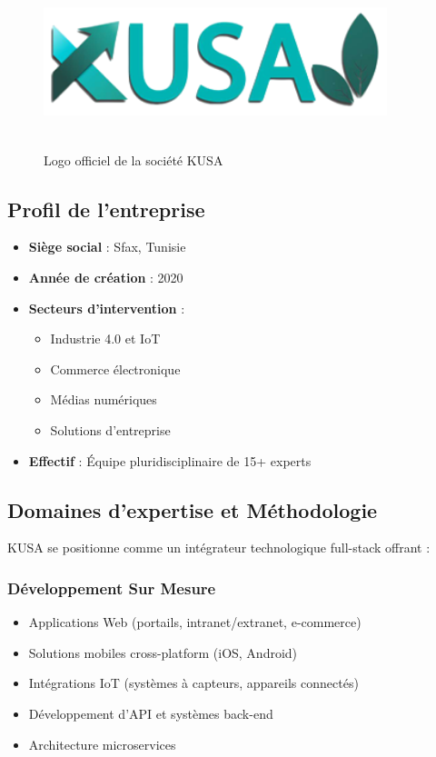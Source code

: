 \begin{figure}[hbt!]
  \centering
  \includegraphics[width=10cm,height=5cm]{images_pfe/kusa.png}
  \caption{Logo officiel de la société KUSA}
  \label{fig:kusa_logo}
\end{figure}
\FloatBarrier
\clearpage
\subsection{Profil de l'entreprise}
\begin{itemize}
    \item \textbf{Siège social} : Sfax, Tunisie
    \item \textbf{Année de création} : 2020
    \item \textbf{Secteurs d'intervention} : 
    \begin{itemize}
        \item Industrie 4.0 et IoT
        \item Commerce électronique
        \item Médias numériques
        \item Solutions d'entreprise
    \end{itemize}
    \item \textbf{Effectif} : Équipe pluridisciplinaire de 15+ experts
\end{itemize}

\subsection{Domaines d'expertise et Méthodologie }
KUSA se positionne comme un intégrateur technologique full-stack offrant :

\subsubsection*{ Développement Sur Mesure}
\begin{itemize}
    \item Applications Web (portails, intranet/extranet, e-commerce)
    \item Solutions mobiles cross-platform (iOS, Android)
    \item Intégrations IoT (systèmes à capteurs, appareils connectés)
    \item Développement d'API et systèmes back-end
    \item Architecture microservices
\end{itemize}

